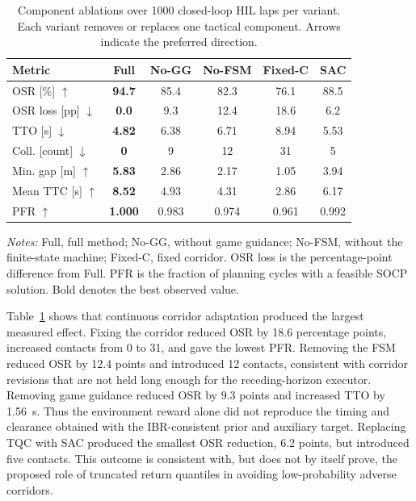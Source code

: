 \begin{table}[!htbp]
\centering
\footnotesize
\setlength{\tabcolsep}{2.3pt}
\renewcommand{\arraystretch}{1.08}
\caption{Component ablations over 1000 closed-loop HIL laps per variant. Each
variant removes or replaces one tactical component. Arrows indicate the
preferred direction.}
\label{tab:ablation}
\begin{tabular}{@{}lccccc@{}}
\toprule
Metric & Full & No-GG & No-FSM & Fixed-C & SAC \\
\midrule
OSR [\%] $\uparrow$            & \textbf{94.7} & 85.4 & 82.3 & 76.1 & 88.5 \\
OSR loss [pp] $\downarrow$    & \textbf{0.0} & 9.3 & 12.4 & 18.6 & 6.2 \\
TTO [s] $\downarrow$           & \textbf{4.82} & 6.38 & 6.71 & 8.94 & 5.53 \\
Coll. [count] $\downarrow$    & \textbf{0} & 9 & 12 & 31 & 5 \\
Min. gap [m] $\uparrow$       & \textbf{5.83} & 2.86 & 2.17 & 1.05 & 3.94 \\
Mean TTC [s] $\uparrow$       & \textbf{8.52} & 4.93 & 4.31 & 2.86 & 6.17 \\
PFR $\uparrow$                & \textbf{1.000} & 0.983 & 0.974 & 0.961 & 0.992 \\
\bottomrule
\end{tabular}
\vspace{1mm}

\begin{minipage}{\columnwidth}
\scriptsize
\emph{Notes:} Full, full method; No-GG, without game guidance; No-FSM, without
the finite-state machine; Fixed-C, fixed corridor. OSR loss is the
percentage-point difference from Full. PFR is the fraction of planning cycles with a feasible SOCP
solution. Bold denotes the best observed value.
\end{minipage}
\end{table}

Table~\ref{tab:ablation} shows that continuous corridor adaptation produced the
largest measured effect. Fixing the corridor reduced OSR by 18.6 percentage
points, increased contacts from 0 to 31, and gave the lowest PFR. Removing the
FSM reduced OSR by 12.4 points and
introduced 12 contacts, consistent with corridor revisions that are not held
long enough for the receding-horizon executor. Removing game guidance reduced
OSR by 9.3 points and increased TTO by 1.56~s. Thus the environment reward
alone did not reproduce the timing and clearance obtained with the
IBR-consistent prior and auxiliary target. Replacing TQC with SAC produced the
smallest OSR reduction, 6.2 points, but introduced five contacts. This outcome
is consistent with, but does not by itself prove, the proposed role of
truncated return quantiles in avoiding low-probability adverse corridors.

